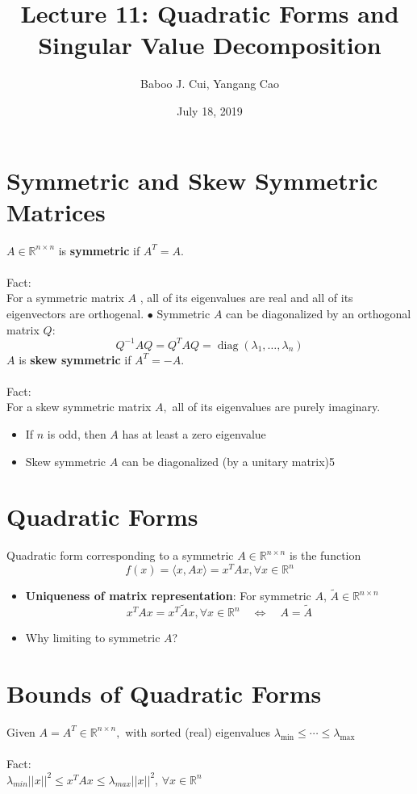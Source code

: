 \documentclass[10pt,a4paper,oneside]{article}
\date{July 18, 2019}
\author{Baboo J. Cui, Yangang Cao}
\title{Lecture 11: Quadratic Forms and Singular Value
	Decomposition}
\begin{document}
\maketitle
\tableofcontents
\newpage
\section{Symmetric and Skew Symmetric Matrices}
$A \in \mathbb{R}^{n \times n}$ is {\bfseries symmetric} if $A^{T}=A$.\\
\\Fact:\\
For a symmetric matrix $A$ , all of its eigenvalues are real and all of its eigenvectors are orthogenal.
$\bullet$ Symmetric $A$ can be diagonalized by an orthogonal matrix $Q$:
\[
Q^{-1} A Q=Q^{T} A Q=\operatorname{diag}\left(\lambda_{1}, \ldots, \lambda_{n}\right)
\]
$A$ is {\bfseries skew symmetric} if $A^{T}=-A$.\\
\\Fact:\\
For a skew symmetric matrix $A,$ all of its eigenvalues are purely imaginary.
\begin{itemize}
\item If $n$ is odd, then $A$ has at least a zero eigenvalue
\item Skew symmetric $A$ can be diagonalized (by a unitary matrix)5
\end{itemize}
\section{Quadratic Forms}
Quadratic form corresponding to a symmetric $A \in \mathbb{R}^{n \times n}$ is the function
\[
f(x)=\langle x, A x\rangle=x^{T} A x, \forall x \in \mathbb{R}^{n}
\]
\begin{itemize}
\item {\bfseries Uniqueness of matrix representation}: For symmetric $A$, $\tilde{A}\in\mathbb{R}^{n\times n}$
\[
x^{T} A x=x^{T} \tilde{A} x, \forall x \in \mathbb{R}^{n} \quad \Leftrightarrow \quad A=\tilde{A}
\]
\item Why limiting to symmetric $A$?
\end{itemize}
\section{Bounds of Quadratic Forms}
Given $A=A^{T} \in \mathbb{R}^{n \times n},$ with sorted (real) eigenvalues $\lambda_{\min } \leq \cdots \leq \lambda_{\max }$\\
\\Fact:\\
$\lambda_{min}||x||^2\leq x^TAx\leq\lambda_{max}||x||^2$, $\forall x\in\mathbb{R}^n$
\end{document}
